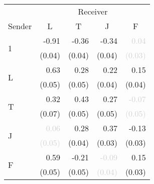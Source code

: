 \begin{tabular}{lrrrr}
\toprule
& \multicolumn{4}{c}{Receiver} \\
\cmidrule(l){2-5}
Sender & \multicolumn{1}{c}{L} & \multicolumn{1}{c}{T} & \multicolumn{1}{c}{J} & \multicolumn{1}{c}{F} \\
\midrule
\multirow{2}{*}{1} &-0.91 &-0.36 &-0.34 &\textcolor{LightGray}{0.04}\\
 &\scriptsize{(0.04)} &\scriptsize{(0.04)} &\scriptsize{(0.04)} &\textcolor{LightGray}{\scriptsize{(0.03)}}\\[1ex]
\multirow{2}{*}{L} &\cellcolor{Gray}0.63 &0.28 &0.22 &0.15\\
 &\cellcolor{Gray}\scriptsize{(0.05)} &\scriptsize{(0.05)} &\scriptsize{(0.04)} &\scriptsize{(0.04)}\\[1ex]
\multirow{2}{*}{T} &0.32 &\cellcolor{Gray}0.43 &0.27 &\textcolor{LightGray}{-0.07}\\
 &\scriptsize{(0.07)} &\cellcolor{Gray}\scriptsize{(0.05)} &\scriptsize{(0.05)} &\textcolor{LightGray}{\scriptsize{(0.05)}}\\[1ex]
\multirow{2}{*}{J} &\textcolor{LightGray}{0.06} &0.28 &\cellcolor{Gray}0.37 &-0.13\\
 &\textcolor{LightGray}{\scriptsize{(0.05)}} &\scriptsize{(0.04)} &\cellcolor{Gray}\scriptsize{(0.03)} &\scriptsize{(0.03)}\\[1ex]
\multirow{2}{*}{F} &0.59 &-0.21 &\textcolor{LightGray}{-0.09} &\cellcolor{Gray}0.15\\
 &\scriptsize{(0.05)} &\scriptsize{(0.05)} &\textcolor{LightGray}{\scriptsize{(0.04)}} &\cellcolor{Gray}\scriptsize{(0.03)}\\[1ex]
\bottomrule
\end{tabular}
